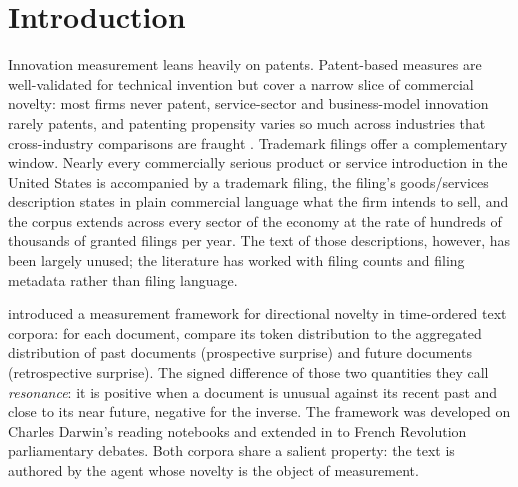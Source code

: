 \documentclass[11pt]{article}
\begin{document}
\section{Introduction}

Innovation measurement leans heavily on patents. Patent-based measures are
well-validated for technical invention but cover a narrow slice of
commercial novelty: most firms never patent, service-sector and
business-model innovation rarely patents, and patenting propensity varies
so much across industries that cross-industry comparisons are fraught
\citep{Graham2013, Dinlersoz2018}. Trademark filings offer a complementary
window. Nearly every commercially serious product or service introduction
in the United States is accompanied by a trademark filing, the filing's
goods/services description states in plain commercial language what the
firm intends to sell, and the corpus extends across every sector of the
economy at the rate of hundreds of thousands of granted filings per year.
The text of those descriptions, however, has been largely unused; the
literature has worked with filing counts and filing metadata rather than
filing language.

\citet{Murdock2017} introduced a measurement framework for directional
novelty in time-ordered text corpora: for each document, compare its token
distribution to the aggregated distribution of past documents (prospective
surprise) and future documents (retrospective surprise). The signed
difference of those two quantities they call \emph{resonance}: it is
positive when a document is unusual against its recent past and close to
its near future, negative for the inverse. The framework was developed on
Charles Darwin's reading notebooks and extended in \citet{Barron2018} to
French Revolution parliamentary debates. Both corpora share a salient
property: the text is authored by the agent whose novelty is the object of
measurement.
\end{document}
